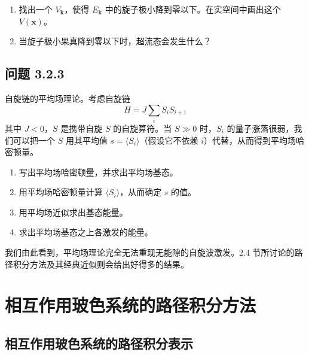\begin{enumerate}
\item 找出一个 $V_{\pmb{k}}$，使得 $E_{\pmb{k}}$ 中的旋子极小降到零以下。在实空间中画出这个 $V(\pmb{x})$。
\item 当旋子极小果真降到零以下时，超流态会发生什么？
\end{enumerate}

\subsection*{问题 3.2.3}

自旋链的平均场理论。考虑自旋链
\begin{equation*}
H=J\sum_i S_iS_{i+1}
\end{equation*}
其中 $J<0$，$S$ 是携带自旋 $S$ 的自旋算符。当 $S\gg0$ 时，$S_i$ 的量子涨落很弱，我们可以把一个 $S$ 用其平均值 $s=\langle S_i\rangle$（假设它不依赖 $i$）代替，从而得到平均场哈密顿量。
\begin{enumerate}
\item 写出平均场哈密顿量，并求出平均场基态。
\item 用平均场哈密顿量计算 $\langle S_i\rangle$，从而确定 $s$ 的值。
\item 用平均场近似求出基态能量。
\item 求出平均场基态之上各激发的能量。
\end{enumerate}

我们由此看到，平均场理论完全无法重现无能隙的自旋波激发。2.4 节所讨论的路径积分方法及其经典近似则会给出好得多的结果。

\section{相互作用玻色系统的路径积分方法}

\subsection{相互作用玻色系统的路径积分表示}

